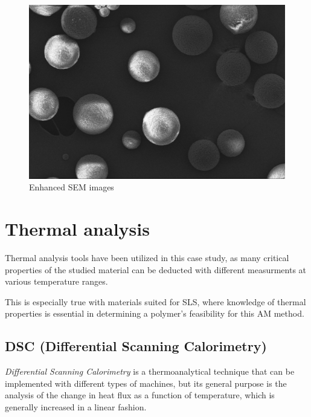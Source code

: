 \documentclass{article}
\begin{document}
                \begin{figure}[h!]
                    \centering 
                    \includegraphics[width=\textwidth]{Pictures/SEM/Edited/04_03.png}
                    \caption{Enhanced SEM images \autocites{Pixelmator_Pro}{GIMP}}
                    \label{fig:SEM_particles6}
                \end{figure}

    \clearpage
    \section{Thermal analysis\label{Thermal_analysis}}
    
    Thermal analysis tools have been utilized in this case study, as many critical properties of the studied material 
    can be deducted with different measurments at various temperature ranges. 

    This is especially true with materials suited for SLS, where knowledge of thermal properties is 
    essential in determining a polymer's feasibility for this AM method. 

        \subsection{DSC (Differential Scanning Calorimetry)\label{DSC_analysis}}
        
        \textit{Differential Scanning Calorimetry} is a thermoanalytical technique that can be implemented with different types of machines, 
        but its general purpose is the analysis of the change in heat flux as a function of temperature, which is generally increased in 
        a linear fashion. 
        
\end{document}
